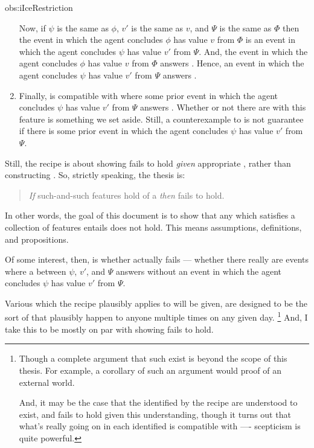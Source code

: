 \begin{note}
\begin{motivation}{obs:iIceRestriction}
\begin{enumerate}
    Now, if \(\psi\) is the same as \(\phi\), \(v'\) is the same as \(v\), and \(\Psi\) is the same as \(\Phi\) then the event in which the agent concludes \(\phi\) has value \(v\) from \(\Phi\) is an event in which the agent concludes \(\psi\) has value \(v'\) from \(\Psi\).
    And, the event in which the agent concludes \(\phi\) has value \(v\) from \(\Phi\) answers \qHow{}.
    Hence, an event in which the agent concludes \(\psi\) has value \(v'\) from \(\Psi\) answers \qHow{}.
  \item
    Finally, \qHow{} is compatible with  where some prior event in which the agent concludes \(\psi\) has value \(v'\) from \(\Psi\) answers \qHow{}.
    Whether or not there are  with this feature is something we set aside.
    Still, a counterexample to \issueInclusion{} is not guarantee if there is some prior event in which the agent concludes \(\psi\) has value \(v'\) from \(\Psi\).
  \end{enumerate}
  \vspace{-\baselineskip}
  \end{motivation}
\end{note}


\begin{note}
  Still, the recipe is about showing \issueInclusion{} fails to hold \emph{given} appropriate , rather than constructing .
  So, strictly speaking, the thesis is:
  \begin{quote}
    \emph{If} such-and-such features hold of a \scen{} \emph{then} \issueInclusion{} fails to hold.
  \end{quote}
  In other words, the goal of this document is to show that any  which satisfies a collection of features entails \issueInclusion{} does not hold.
  This means assumptions, definitions, and propositions.

  Of some interest, then, is whether \issueInclusion{} actually fails --- whether there really are events where a \ros{} between \(\psi\), \(v'\), and \(\Psi\) answers \qWhy{} without an event in which the agent concludes \(\psi\) has value \(v'\) from \(\Psi\).

  Various  which the recipe plausibly applies to will be given, are designed to be the sort of  that plausibly happen to anyone multiple times on any given day.%
  \footnote{
    Though a complete argument that such  exist is beyond the scope of this thesis.
    For example, a corollary of such an argument would proof of an external world.

    And, it may be the case that the  identified by the recipe are understood to exist, and \issueInclusion{} fails to hold given this understanding, though it turns out that what's really going on in each  identified is compatible with \issueInclusion{} ---- scepticism is quite powerful.
  }
  And, I take this to be mostly on par with showing \issueInclusion{} fails to hold.
\end{note}


